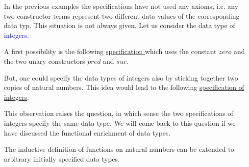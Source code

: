 \documentclass[landscape, autoslides, light]{mmiss}
\begin{document}
\begin{Package}[Label={FSDPT}, Title={Formal Specification of Data and Process Types}, ShortTitle={FSDPT}, Authors={Horst Reichel}, Date={February 2003}, LevelOfDetail=Lecture, Language=en-GB]
\begin{Section}[Title={Initial Algebras as Data Types}, Label={section3}]
\begin{Section}[Title={Initial Specifications of Data Types}, Label={section3_2}]
\begin{Paragraph}[Title={Examples}, Label=Paragraph45]

\end{Paragraph}
\begin{Paragraph}[Title={Examples}, Label=Paragraph46]
In the previous examples the specifications have not used any
axioms, i.e. any two constructor terms represent two different
data values of the corresponding data typ. This situation is not
always given. Let us consider the data type of
\textcolor{blue}{integers}.

A first possibility is the following
\hyperlink{integer}{specification } which uses the constant $zero$
and the two unary constructors $pred$ and $suc$.


\end{Paragraph}
\begin{Paragraph}[Label=Paragraph47]

But, one could specify the data types of integers also by sticking
together two copies of natural numbers. This idea would lead to
the following \hyperlink{integer2}{specification of integers}.

This observation raises the question, in which sense  the two
specifications of integers specify the same data type. We will
come back to this question if we have discussed the functional
enrichment of data types.

\end{Paragraph}
\end{Section}
\begin{Section}[Title={Functional Enrichment of Data Types}, Label={section3_3}]
\begin{Paragraph}


\end{Paragraph}
\begin{Paragraph}[Label=Paragraph48]
\small

The inductive definition of functions on natural numbers can be
extended to arbitrary initially specified data types.


\end{Paragraph}
\end{Section}
\end{Section}
\end{Package}
\end{document}
